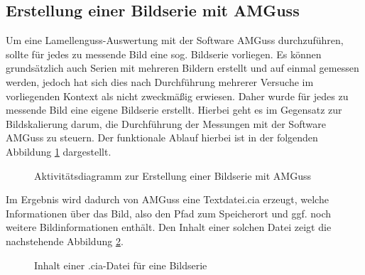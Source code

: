 \documentclass[
fontsize=10pt, 
listof = totoc,
parskip = half	
]{report}
\begin{document}
\subsection{Erstellung einer Bildserie mit AMGuss}
\label{subsec:FlowErstellungBildserieAMGuss}

Um eine Lamellenguss-Auswertung mit der Software AMGuss durchzuführen, sollte für jedes zu messende Bild eine sog. Bildserie vorliegen. Es können grundsätzlich auch Serien mit mehreren Bildern erstellt und auf einmal gemessen werden, jedoch hat sich dies nach Durchführung mehrerer Versuche im vorliegenden Kontext als nicht zweckmäßig erwiesen. Daher wurde für jedes zu messende Bild eine eigene Bildserie erstellt. Hierbei geht es im Gegensatz zur Bildskalierung darum, die Durchführung der Messungen mit der Software AMGuss zu steuern. Der funktionale Ablauf hierbei ist in der folgenden Abbildung \ref{fig:FlowBildserieErstellen} dargestellt.


\begin{figure}[H]
	\centering
	\caption{Aktivitätsdiagramm zur Erstellung einer Bildserie mit AMGuss}
	\label{fig:FlowBildserieErstellen}
\end{figure}

\noindent Im Ergebnis wird dadurch von AMGuss eine Textdatei.cia erzeugt, welche Informationen über das Bild, also den Pfad zum Speicherort und ggf. noch weitere Bildinformationen enthält. Den Inhalt einer solchen Datei zeigt die nachstehende Abbildung \ref{fig:CiaContent}.

\begin{figure}[H]
	\centering
	\caption{Inhalt einer .cia-Datei für eine Bildserie}
	\label{fig:CiaContent}
\end{figure}
\end{document}
